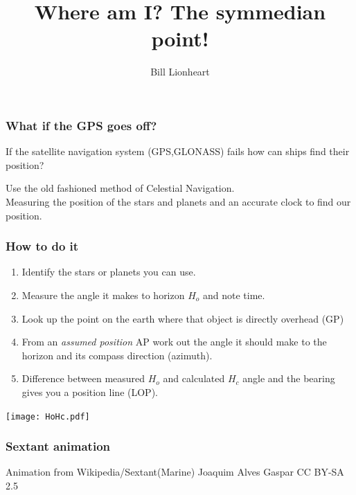 \documentclass{beamer}
\begin{document}
\title{Where am I? The symmedian point!}   
\author{Bill Lionheart} 

\frame{\titlepage}




\begin{frame} \frametitle{What if the GPS goes off?}
\begin{center}
If the satellite navigation system (GPS,GLONASS) fails how can ships find their position?
\end{center}
\pause
\begin{center}
Use the old fashioned method of {\color{red}Celestial Navigation.} \\
Measuring the position of the stars and planets and an accurate clock to find our position.
\end{center}

\end{frame}

\begin{frame} \frametitle{How to do it}
\begin{enumerate}
\item<1-> Identify the stars or planets you can use.
\item<2-> Measure the angle it makes to horizon $H_o$ and note time. 
\item<3-> Look up the point on the earth where that object is directly overhead (GP)
\item<4-> From an {\em assumed position} AP work out the angle it should make to the horizon and its compass direction (azimuth).
\item<5-> Difference between measured $H_o$ and calculated $H_c$ angle and the bearing gives you a position line (LOP). 
\end{enumerate}
\vspace{-0.6cm}
\texttt{[image: HoHc.pdf]}


\end{frame}


\begin{frame}\frametitle{Sextant animation}




 {\tiny Animation from Wikipedia/Sextant(Marine) Joaquim Alves Gaspar CC BY-SA 2.5}



\end{frame}
\end{document}
